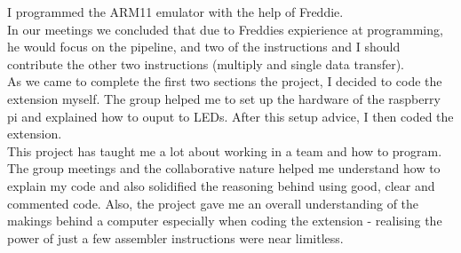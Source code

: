 I programmed the ARM11 emulator with the help of Freddie. 
~\\

In our meetings we concluded that due to Freddies expierience at programming, he would focus on the pipeline, and two of the instructions and I should contribute the other two instructions (multiply and single data transfer).
~\\

As we came to complete the first two sections the project, I decided to code the extension myself. The group helped me to set up the hardware of the raspberry pi and explained how to ouput to LEDs. After this setup advice, I then coded the extension. 
~\\

This project has taught me a lot about working in a team and how to program. The group meetings and the collaborative nature helped me understand how to explain my code and also solidified the reasoning behind using good, clear and commented code. Also, the project gave me an overall understanding of the makings behind a computer especially when coding the extension - realising the power of just a few assembler instructions were near limitless.
